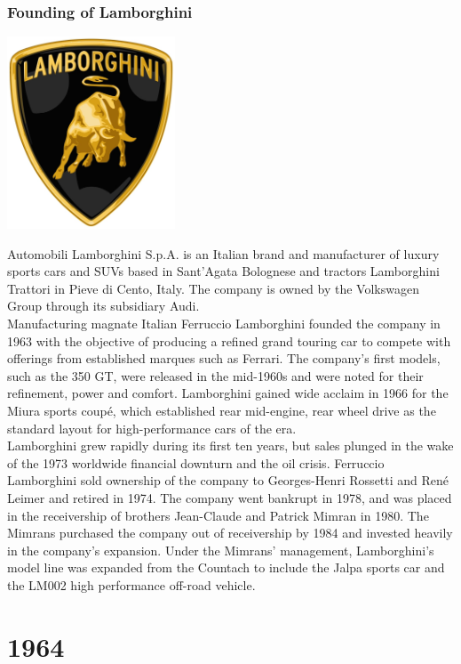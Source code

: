 \documentclass[11pt]{report}
\begin{document}
\subsection{Founding of Lamborghini}
\vspace{2mm}\begin{center}\includegraphics[width=5cm]{./img/lamborghiniLogo.jpg}\end{center}
Automobili Lamborghini S.p.A. is an Italian brand and manufacturer of luxury sports cars and SUVs based in Sant'Agata Bolognese and tractors Lamborghini Trattori in Pieve di Cento, Italy. The company is owned by the Volkswagen Group through its subsidiary Audi.\\ \indent Manufacturing magnate Italian Ferruccio Lamborghini founded the company in 1963 with the objective of producing a refined grand touring car to compete with offerings from established marques such as Ferrari. The company's first models, such as the 350 GT, were released in the mid-1960s and were noted for their refinement, power and comfort. Lamborghini gained wide acclaim in 1966 for the Miura sports coupé, which established rear mid-engine, rear wheel drive as the standard layout for high-performance cars of the era.\\
\indent Lamborghini grew rapidly during its first ten years, but sales plunged in the wake of the 1973 worldwide financial downturn and the oil crisis. Ferruccio Lamborghini sold ownership of the company to Georges-Henri Rossetti and René Leimer and retired in 1974. The company went bankrupt in 1978, and was placed in the receivership of brothers Jean-Claude and Patrick Mimran in 1980. The Mimrans purchased the company out of receivership by 1984 and invested heavily in the company's expansion. Under the Mimrans' management, Lamborghini's model line was expanded from the Countach to include the Jalpa sports car and the LM002 high performance off-road vehicle.

\chapter{1964}
\end{document}
